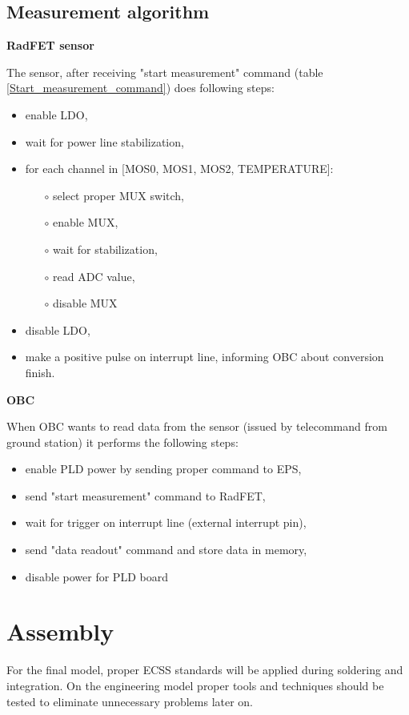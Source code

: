     \subsection{Measurement algorithm}
    \bigskip \textbf{RadFET sensor}

    The sensor, after receiving "start measurement" command (table \ref{Start_measurement_command}) does following steps:
    \begin{itemize}
        \item enable LDO,
        \item wait for power line stabilization,
        \item for each channel in [MOS0, MOS1, MOS2, TEMPERATURE]:
        \begin{itemize}
            \item[$\circ$] select proper MUX switch,
            \item[$\circ$] enable MUX,
            \item[$\circ$] wait for stabilization,
            \item[$\circ$] read ADC value,
            \item[$\circ$] disable MUX
        \end{itemize}
        \item disable LDO,
        \item make a positive pulse on interrupt line, informing OBC about conversion finish.
    \end{itemize}

    \bigskip \textbf{OBC}

    When OBC wants to read data from the sensor (issued by telecommand from ground station) it performs the following steps:
    \begin{itemize}
        \item enable PLD power by sending proper command to EPS,
        \item send "start measurement" command to RadFET,
        \item wait for trigger on interrupt line (external interrupt pin),
        \item send "data readout" command and store data in memory,
        \item disable power for PLD board
    \end{itemize}

\section{Assembly}
    For the final model, proper ECSS standards will be applied during soldering and integration. On the engineering model proper tools and techniques should be tested to eliminate unnecessary problems later on.

